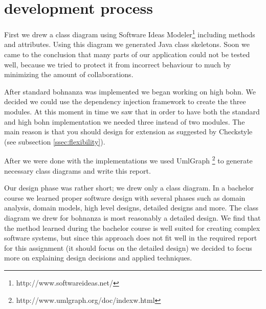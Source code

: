 \section{development process}
First we drew a class diagram using Software Ideas Modeler\footnote{http://www.softwareideas.net/} including methods and attributes. Using
this diagram we generated Java class skeletons. Soon we came to the conclusion that many parts of our application could not be
tested well, because we tried to protect it from incorrect behaviour to much by minimizing the amount of collaborations.


After standard bohnanza was implemented we began working on high bohn. We decided we could use the dependency injection framework to create
the three modules. At this moment in time we saw that in order to have both the standard and high bohn implementation we needed three
instead of two modules. The main reason is that you should design for extension as suggested by Checkstyle (see subsection
\ref{ssec:flexibility}). 

After we were done with the implementations we used
UmlGraph \footnote{http://www.umlgraph.org/doc/indexw.html} to generate necessary class diagrams and write this report. 

Our design phase was rather short; we drew only a class diagram. In a bachelor course we learned proper software design with several phases
such as domain analysis, domain models, high level designs, detailed designs and more. The class diagram we drew for bohnanza is most
reasonably a detailed design. We find that the method learned during the bachelor course is well suited for creating complex software systems,
but since this approach does not fit well in the required report for this assignment (it should focus on the detailed design) we decided to
focus more on explaining design decisions and applied techniques.
